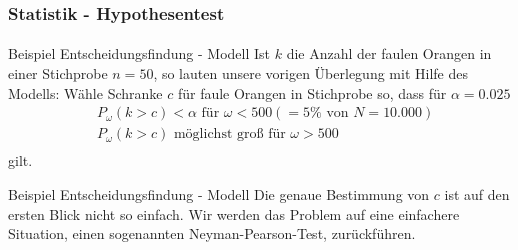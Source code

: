 \documentclass{beamer}
\begin{document}
\begin{frame}
    \frametitle{Statistik - Hypothesentest}
\framesubtitle{}
\begin{block}{Beispiel Entscheidungsfindung - Modell}
Ist $k$ die Anzahl der faulen Orangen in einer Stichprobe $n = 50$, so lauten unsere vorigen Überlegung mit Hilfe des Modells: Wähle Schranke $c$ für faule Orangen in Stichprobe so,  dass für $\alpha = 0.025$
\begin{align*}
& P_\omega(k >c) < \alpha  \text{ für } \omega < 500 (= 5 \% \text{ von } N = 10.000) \\
& P_\omega(k >c) \text{ möglichst groß für } \omega > 500\\
\end{align*}
gilt.
\end{block}

\begin{block}{Beispiel Entscheidungsfindung - Modell}
Die genaue Bestimmung von $c$ ist auf den ersten Blick nicht so einfach. Wir werden das Problem auf eine einfachere Situation, einen sogenannten Neyman-Pearson-Test, zurückführen. 
\end{block}


 \end{frame}
\end{document}
